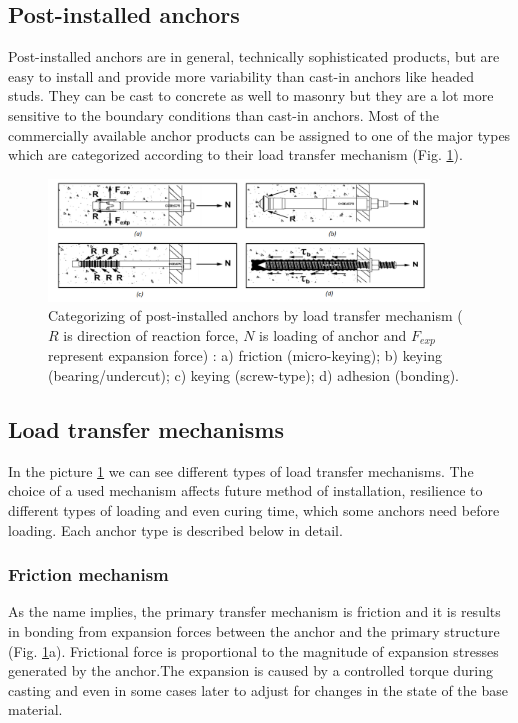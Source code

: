 \subsection{Post-installed anchors}
Post-installed anchors are in general, technically sophisticated products, but are easy to install and provide more variability than cast-in anchors like headed studs. They can be cast to concrete as well to masonry but they are a lot more sensitive to the boundary conditions than cast-in anchors. Most of the commercially available anchor products can be assigned to one of the major types which are categorized according to their load transfer mechanism (Fig. \ref{obr:Post_installed_anchors}).

\begin{figure}[h!]
	\centering
	\includegraphics[width=0.9\textwidth]{obrazky/post_installed_anchor_types_repaired.png}
	\caption[Categorizing of post-installed anchors by load transfer mechanism]{Categorizing of post-installed anchors by load transfer mechanism ($R$ is direction of reaction force, $N$ is loading of anchor and $F_{exp}$ represent expansion force) \cite{hilti_anchors}: a) friction (micro-keying); b) keying (bearing/undercut); c) keying (screw-type); d) adhesion (bonding).}\label{obr:Post_installed_anchors}
\end{figure}

\subsection{Load transfer mechanisms}
In the picture \ref{obr:Post_installed_anchors} we can see different types of load transfer mechanisms. The choice of a  used mechanism affects future method of installation, resilience to different types of loading and even curing time, which some anchors need before loading. Each anchor type is described below in detail. 

\subsubsection{Friction mechanism}
As the name implies, the primary transfer mechanism is friction and it is results in bonding from expansion forces between the anchor and the primary structure (Fig. \ref{obr:Post_installed_anchors}a). Frictional force is proportional to the magnitude of expansion stresses generated by the anchor.The expansion is caused by a controlled torque during casting and even in some cases later to adjust for changes in the state of the base material.

